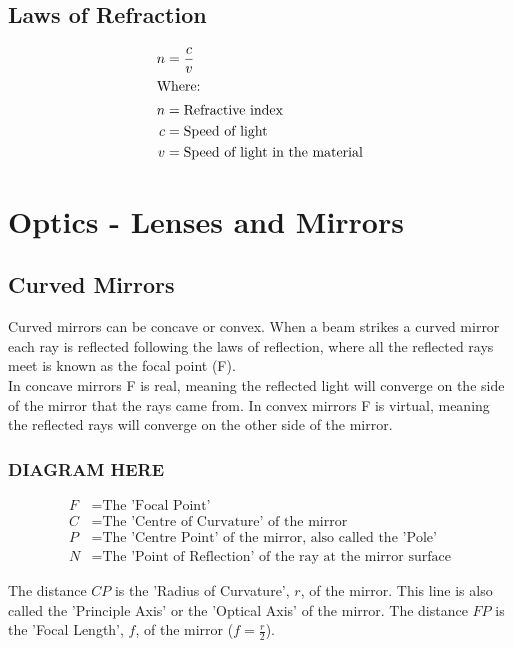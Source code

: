 \documentclass[a4paper, 12pt]{article}
\begin{document}
	\subsection{Laws of Refraction}
		\begin{align*}
			n & = \frac{c}{v} \\
			\intertext{Where: }
			n &= \text{Refractive index} \\
			c &= \text{Speed of light} \\
			v &= \text{Speed of light in the material}
		\end{align*}
			
\newpage

\section{Optics - Lenses and Mirrors}
	\subsection{Curved Mirrors}

		Curved mirrors can be concave or convex. When a beam strikes a curved mirror each ray is reflected following the laws of reflection, where all the reflected rays meet is known as the focal point (F). \\
		In concave mirrors F is real, meaning the reflected light will converge on the side of the mirror that the rays came from. In convex mirrors F is virtual, meaning the reflected rays will converge on the other side of the mirror.
		
		\subsubsection*{DIAGRAM HERE}
		
		\begin{align*}
			F &= \text{The 'Focal Point'} \\
			C &= \text{The 'Centre of Curvature' of the mirror} \\
			P &= \text{The 'Centre Point' of the mirror, also called the 'Pole'} \\
			N &= \text{The 'Point of Reflection' of the ray at the mirror surface}
		\end{align*}
	
		The distance $CP$ is the 'Radius of Curvature', $r$, of the mirror. This line is also called the 'Principle Axis' or the 'Optical Axis' of the mirror. The distance $FP$ is the 'Focal Length', $f$, of the mirror ($f=\frac{r}{2}$).
		
\end{document}
